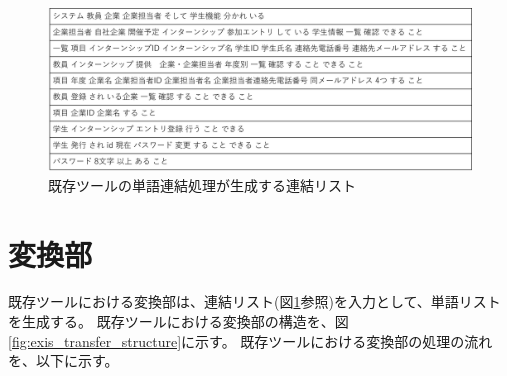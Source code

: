 \begin{figure}[tp]
    \begin{center}
        \includegraphics[width=1.0\columnwidth]{image/exis_connect_list.png}
        \caption{既存ツールの単語連結処理が生成する連結リスト}
        \label{fig:exis_connect_list}
    \end{center}
\end{figure}

\section{変換部}
\label{sec:exis_transfer}
既存ツールにおける変換部は、連結リスト(図\ref{fig:exis_connect_list}参照)を入力として、単語リストを生成する。
既存ツールにおける変換部の構造を、図\ref{fig:exis_transfer_structure}に示す。
既存ツールにおける変換部の処理の流れを、以下に示す。

